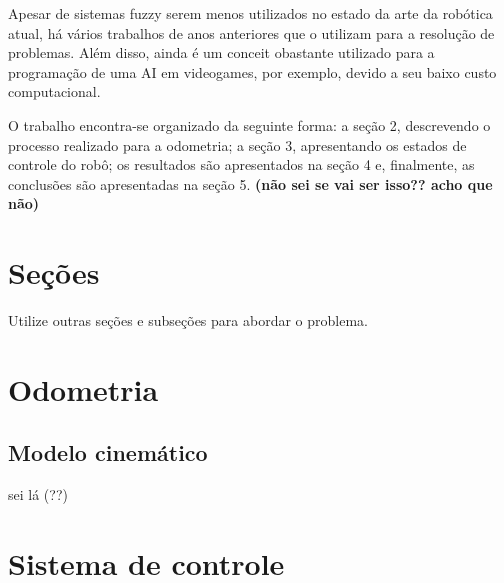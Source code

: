 \documentclass[twoside,conference,a4paper]{IEEEtran}
\begin{document}
Apesar de sistemas fuzzy serem menos utilizados no estado da arte da robótica atual, há vários trabalhos de anos anteriores que o utilizam para a resolução de problemas. Além disso, ainda é um conceit obastante utilizado para a programação de uma AI em videogames, por exemplo, devido a seu baixo custo computacional.

O trabalho encontra-se organizado da seguinte forma: a seção 2, descrevendo o processo realizado para a odometria; a seção 3, apresentando os estados de controle do robô; os resultados são apresentados na seção 4 e, finalmente, as conclusões são apresentadas na seção 5. \textbf{(não sei se vai ser isso?? acho que não)}




\section{Seções}

Utilize outras seções e subseções para abordar o problema. 

\section{Odometria}

\subsection{Modelo cinemático}

sei lá (??)

\section{Sistema de controle}
\end{document}
